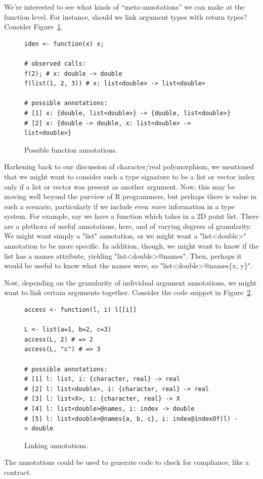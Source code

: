 \documentclass[acmsmall,10pt,review,anonymous]{acmart}\settopmatter{printfolios=true,printccs=false,printacmref=false}
\begin{document}
We're interested to see what kinds of ``meta-annotations'' we can make at the function level.
For instance, should we link argument types with return types?
Consider Figure~\ref{fig:funanno}.
\begin{figure}[!hb]{\small\begin{lstlisting}[style=R]
iden <- function(x) x;

# observed calls:
f(2); # x: double -> double
f(list(1, 2, 3)) # x: list<double> -> list<double>

# possible annotations:
# [1] x: {double, list<double>} -> {double, list<double>}
# [2] x: {double -> double, x: list<double> -> list<double>}
\end{lstlisting}}\caption{Possible function annotations.}\label{fig:funanno}\end{figure}

Harkening back to our discussion of character/real polymorphism, we mentioned that we might want to consider such a type signature to be a list or vector index only if a list or vector was present as another argument.
Now, this may be moving well beyond the purview of R programmers, but perhaps there is value in such a scenario, particularly if we include even {\it more} information in a type system.
For example, say we have a function which takes in a 2D point list.
There are a plethora of useful annotations, here, and of varying degrees of granularity.
We might want simply a "list" annotation, or we might want a "list<double>" annotation to be more specific.
In addition, though, we might want to know if the list has a names attribute, yielding "list<double>@names".
Then, perhaps it would be useful to know what the names were, so "list<double>@names\{x, y\}".

Now, depending on the granularity of individual argument annotations, we might want to link certain arguments together.
Consider the code snippet in Figure~\ref{fig:indexof}.
\begin{figure}[!hb]{\small\begin{lstlisting}[style=R]
access <- function(l, i) l[[i]]

L <- list(a=1, b=2, c=3)
access(L, 2) # => 2
access(L, "c") # => 3

# possible annotations:
# [1] l: list, i: {character, real} -> real
# [2] l: list<double>, i: {character, real} -> real
# [3] l: list<X>, i: {character, real} -> X
# [4] l: list<double>@names, i: index -> double
# [5] l: list<double>@names{a, b, c}, i: index@indexOf(l) -> double
\end{lstlisting}}\caption{Linking annotations.}\label{fig:indexof}\end{figure}
The annotations could be used to generate code to check for compliance, like a contract.
\end{document}
